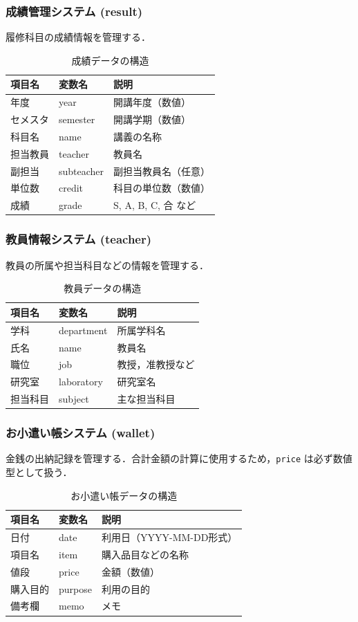 \subsubsection{成績管理システム (result)}
履修科目の成績情報を管理する．
\begin{table}[H]
\caption{成績データの構造}
\centering
\begin{tabular}{l|l|l}
\hline
項目名 & 変数名 & 説明 \\
\hline \hline
年度 & year & 開講年度（数値） \\
セメスタ & semester & 開講学期（数値） \\
科目名 & name & 講義の名称 \\
担当教員 & teacher & 教員名 \\
副担当 & subteacher & 副担当教員名（任意） \\
単位数 & credit & 科目の単位数（数値） \\
成績 & grade & S, A, B, C, 合 など \\
\hline
\end{tabular}
\end{table}

\subsubsection{教員情報システム (teacher)}
教員の所属や担当科目などの情報を管理する．
\begin{table}[H]
\caption{教員データの構造}
\centering
\begin{tabular}{l|l|l}
\hline
項目名 & 変数名 & 説明 \\
\hline \hline
学科 & department & 所属学科名 \\
氏名 & name & 教員名 \\
職位 & job & 教授，准教授など \\
研究室 & laboratory & 研究室名 \\
担当科目 & subject & 主な担当科目 \\
\hline
\end{tabular}
\end{table}

\subsubsection{お小遣い帳システム (wallet)}
金銭の出納記録を管理する．合計金額の計算に使用するため，\texttt{price} は必ず数値型として扱う．
\begin{table}[H]
\caption{お小遣い帳データの構造}
\centering
\begin{tabular}{l|l|l}
\hline
項目名 & 変数名 & 説明 \\
\hline \hline
日付 & date & 利用日（YYYY-MM-DD形式） \\
項目名 & item & 購入品目などの名称 \\
値段 & price & 金額（数値） \\
購入目的 & purpose & 利用の目的 \\
備考欄 & memo & メモ \\
\hline
\end{tabular}
\end{table}

